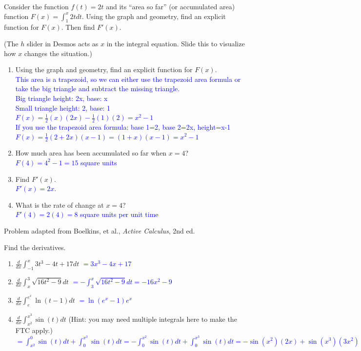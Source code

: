 \documentclass{ximera}
\begin{document}
\begin{exercise}
    Consider the function $f(t)=2t$ and its ``area so far'' (or accumulated area) function $F(x)=\int_1^x 2tdt$.  Using the graph and geometry, find an explicit function for $F(x)$.  Then find $F'(x)$.
    \begin{center}
    \end{center}
    (The $h$ slider in Desmos acts as $x$ in the integral equation.  Slide this to visualize how $x$ changes the situation.)\\
        \begin{enumerate}
        \item Using the graph and geometry, find an explicit function for $F(x)$.  \\
        \textcolor{blue}{This area is a trapezoid, so we can either use the trapezoid area formula or take the big triangle and subtract the missing triangle. \\
    Big triangle height: 2x, base: x\\
    Small triangle height: 2, base: 1\\
     $F(x)=\frac12(x)(2x)-\frac12(1)(2)=x^2-1$\\
     If you use the trapezoid area formula: base 1=2, base 2=2x, height=x-1\\
     $F(x)=\frac12(2+2x)(x-1)=(1+x)(x-1)=x^2-1$}
        \item How much area has been accumulated so far when $x=4$?\\
        \textcolor{blue}{$F(4)=4^2-1=15$ square units}
        \item Find $F'(x)$.\\
        \textcolor{blue}{$F'(x)=2x$.}
        \item What is the rate of change at $x=4$?\\
        \textcolor{blue}{$F'(4)=2(4)=8$ square units per unit time}
    \end{enumerate}
    Problem adapted from Boelkins, et al., \textit{Active Calculus}, 2nd ed.

\end{exercise}

\begin{exercise}
    Find the derivatives.
    \begin{enumerate}
        \item $\frac{d}{dx}\int_{-1}^x 3t^3-4t+17dt$ \textcolor{blue}{$=3x^3-4x+17$}
        \item $\frac{d}{dx}\int_x^3 \sqrt{16t^2-9}dt$ \textcolor{blue}{$=-\int_3^x\sqrt{16t^2-9}dt=-16x^2-9$}
        \item $\frac{d}{dx}\int_e^{e^x} \ln(t-1)dt$ \textcolor{blue}{$=\ln(e^x-1)e^x$}
        \item $\frac{d}{dx}\int_{x^2}^{x^3} \sin(t)dt$ (Hint: you may need multiple integrals here to make the FTC apply.)\\
        \textcolor{blue}{$=\int_{x^2}^0 \sin(t)dt+\int_0^{x^3}\sin(t)dt=-\int_0^{x^2}\sin(t)dt+\int_0^{x^3}\sin(t)dt=-\sin(x^2)(2x)+\sin(x^3)(3x^2)$}
    \end{enumerate}
\end{exercise}
\end{document}
